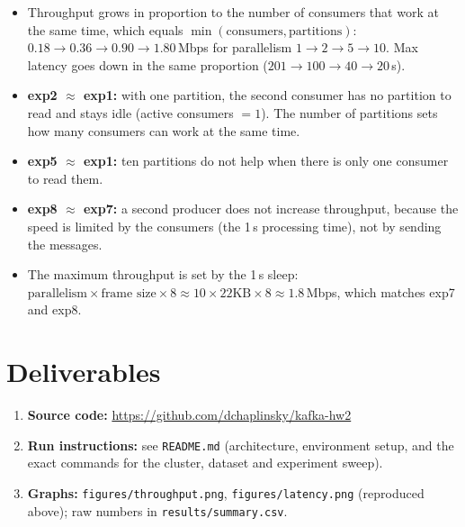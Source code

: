 \documentclass[11pt]{article}
\begin{document}
\begin{itemize}
\item Throughput grows in proportion to the number of consumers that work at the
  same time, which equals $\min(\text{consumers},\text{partitions})$:
  $0.18\to0.36\to0.90\to1.80$\,Mbps for parallelism $1\to2\to5\to10$. Max latency
  goes down in the same proportion ($201\to100\to40\to20$\,s).
\item \textbf{exp2 $\approx$ exp1:} with one partition, the second consumer has no
  partition to read and stays idle (active consumers $=1$). The number of partitions
  sets how many consumers can work at the same time.
\item \textbf{exp5 $\approx$ exp1:} ten partitions do not help when there is only one
  consumer to read them.
\item \textbf{exp8 $\approx$ exp7:} a second producer does not increase throughput,
  because the speed is limited by the consumers (the 1\,s processing time), not by
  sending the messages.
\item The maximum throughput is set by the 1\,s sleep:
  $\text{parallelism}\times\text{frame size}\times 8 \approx 10\times22\text{KB}\times8
  \approx 1.8$\,Mbps, which matches exp7 and exp8.
\end{itemize}

\section{Deliverables}

\begin{enumerate}
\item \textbf{Source code:} \url{https://github.com/dchaplinsky/kafka-hw2}
\item \textbf{Run instructions:} see \texttt{README.md} (architecture, environment setup,
  and the exact commands for the cluster, dataset and experiment sweep).
\item \textbf{Graphs:} \texttt{figures/throughput.png}, \texttt{figures/latency.png}
  (reproduced above); raw numbers in \texttt{results/summary.csv}.
\end{enumerate}
\end{document}
